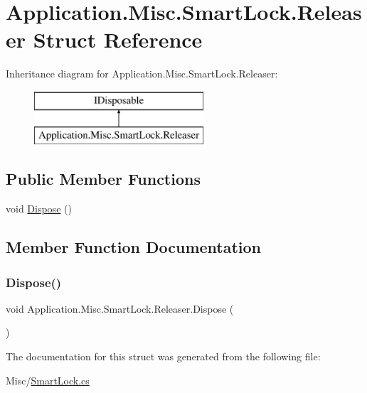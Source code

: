 \hypertarget{struct_application_1_1_misc_1_1_smart_lock_1_1_releaser}{}\section{Application.\+Misc.\+Smart\+Lock.\+Releaser Struct Reference}
\label{struct_application_1_1_misc_1_1_smart_lock_1_1_releaser}
Inheritance diagram for Application.\+Misc.\+Smart\+Lock.\+Releaser\+:\begin{figure}[H]
\begin{center}
\leavevmode
\includegraphics[height=2.000000cm]{struct_application_1_1_misc_1_1_smart_lock_1_1_releaser}
\end{center}
\end{figure}
\subsection*{Public Member Functions}
\begin{DoxyCompactItemize}
\item 
void \mbox{\hyperlink{struct_application_1_1_misc_1_1_smart_lock_1_1_releaser_a373f33cf67fe31aece5a6bf41417bd3c}{Dispose}} ()
\end{DoxyCompactItemize}


\subsection{Member Function Documentation}
\mbox{\label{struct_application_1_1_misc_1_1_smart_lock_1_1_releaser_a373f33cf67fe31aece5a6bf41417bd3c}} 
\subsubsection{\texorpdfstring{Dispose()}{Dispose()}}
{\footnotesize\ttfamily void Application.\+Misc.\+Smart\+Lock.\+Releaser.\+Dispose (\begin{DoxyParamCaption}{ }\end{DoxyParamCaption})}



The documentation for this struct was generated from the following file\+:\begin{DoxyCompactItemize}
\item 
Misc/\mbox{\hyperlink{_smart_lock_8cs}{Smart\+Lock.\+cs}}\end{DoxyCompactItemize}
